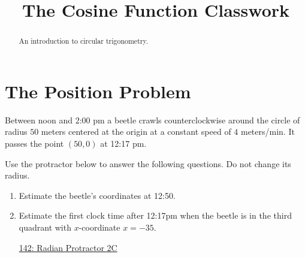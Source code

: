 \documentclass{ximera}
\title{The Cosine Function Classwork}
\begin{document}
\begin{abstract}
An introduction to circular trigonometry.
\end{abstract}
\maketitle


\section{The Position Problem}

\begin{question}  \label{Q9dfedferyghnfetf4}

Between noon and 2:00 pm a beetle crawls counterclockwise around the circle of radius $50$ meters centered at the origin at a constant speed of $4$ meters/min. It passes the point $(50,0)$ at 12:17 pm.

Use the protractor below to answer the following questions. Do not change its radius.
\begin{enumerate}

\item Estimate the beetle's coordinates at 12:50. 

\item Estimate the first clock time after 12:17pm when the beetle is in the third quadrant with $x$-coordinate $x=-35$.

\begin{onlineOnly}
    \begin{center}
\end{center}
\end{onlineOnly}

\href{https://www.desmos.com/calculator/lbkveixdno}{142: Radian Protractor 2C}

\end{enumerate}
\end{question}
\end{document}
